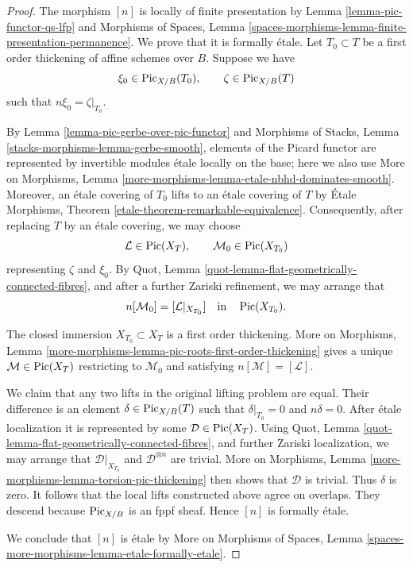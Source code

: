 \begin{proof}
The morphism $[n]$ is locally of finite presentation by
Lemma \ref{lemma-pic-functor-qs-lfp} and
Morphisms of Spaces, Lemma
\ref{spaces-morphisms-lemma-finite-presentation-permanence}.
We prove that it is formally \'etale. Let $T_0 \subset T$ be a first
order thickening of affine schemes over $B$. Suppose we have
$$
\xi_0 \in \mathrm{Pic}_{X/B}(T_0), \qquad
\zeta \in \mathrm{Pic}_{X/B}(T)
$$
such that $n\xi_0 = \zeta|_{T_0}$.

By Lemma \ref{lemma-pic-gerbe-over-pic-functor} and
Morphisms of Stacks, Lemma
\ref{stacks-morphisms-lemma-gerbe-smooth}, elements of the Picard
functor are represented by invertible modules \'etale locally on the
base; here we also use More on Morphisms, Lemma
\ref{more-morphisms-lemma-etale-nbhd-dominates-smooth}.
Moreover, an \'etale covering of $T_0$ lifts to an \'etale covering of
$T$ by \'Etale Morphisms, Theorem
\ref{etale-theorem-remarkable-equivalence}. Consequently, after
replacing $T$ by an \'etale covering, we may choose
$$
\mathcal{L} \in \mathop{\mathrm{Pic}}\nolimits(X_T), \qquad
\mathcal{M}_0 \in \mathop{\mathrm{Pic}}\nolimits(X_{T_0})
$$
representing $\zeta$ and $\xi_0$. By Quot, Lemma
\ref{quot-lemma-flat-geometrically-connected-fibres}, and after a
further Zariski refinement, we may arrange that
$$
n[\mathcal{M}_0] = [\mathcal{L}|_{X_{T_0}}]
\quad\text{in}\quad \mathop{\mathrm{Pic}}\nolimits(X_{T_0}).
$$

The closed immersion $X_{T_0} \subset X_T$ is a first order
thickening. More on Morphisms, Lemma
\ref{more-morphisms-lemma-pic-roots-first-order-thickening}
gives a unique $\mathcal{M} \in \mathop{\mathrm{Pic}}\nolimits(X_T)$ restricting to
$\mathcal{M}_0$ and satisfying $n[\mathcal{M}] = [\mathcal{L}]$.

We claim that any two lifts in the original lifting problem are equal.
Their difference is an element
$\delta \in \mathrm{Pic}_{X/B}(T)$ such that
$\delta|_{T_0} = 0$ and $n\delta = 0$. After \'etale localization it
is represented by some $\mathcal{D} \in \mathop{\mathrm{Pic}}\nolimits(X_T)$. Using
Quot, Lemma \ref{quot-lemma-flat-geometrically-connected-fibres},
and further Zariski localization, we may arrange that
$\mathcal{D}|_{X_{T_0}}$ and $\mathcal{D}^{\otimes n}$ are trivial.
More on Morphisms, Lemma
\ref{more-morphisms-lemma-torsion-pic-thickening} then shows that
$\mathcal{D}$ is trivial. Thus $\delta$ is zero. It follows that the
local lifts constructed above agree on overlaps. They descend because
$\mathrm{Pic}_{X/B}$ is an fppf sheaf. Hence $[n]$ is formally
\'etale.

We conclude that $[n]$ is \'etale by More on Morphisms of Spaces,
Lemma \ref{spaces-more-morphisms-lemma-etale-formally-etale}.
\end{proof}

